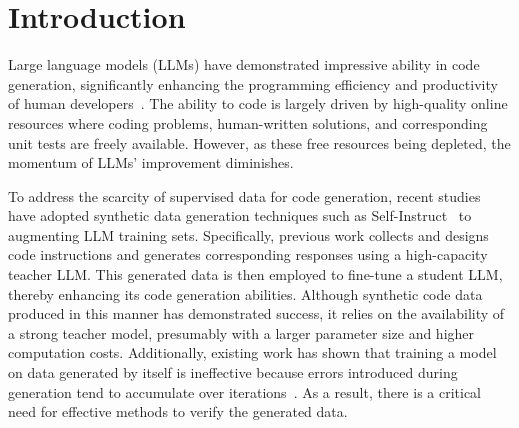 \section{Introduction}



Large language models (LLMs) have demonstrated impressive ability in code generation, significantly enhancing the programming efficiency and productivity of human developers~\cite{li2022competition,roziere2023code,codealpaca}.
The ability to code is largely driven by high-quality online resources where coding problems, human-written solutions, and corresponding unit tests are freely available. However, as these free resources being depleted, the momentum of LLMs' improvement diminishes.

To address the scarcity of supervised data for code generation, recent studies have adopted synthetic data generation techniques such as {\sc Self-Instruct}~\cite{wang2023self} to augmenting LLM training sets. 
Specifically, previous work collects and designs code instructions and generates corresponding responses using a high-capacity teacher LLM. This generated data is then employed to fine-tune a student LLM, thereby enhancing its code generation abilities. 
Although synthetic code data produced in this manner has demonstrated success, it relies on the availability of a strong teacher model, presumably with a larger parameter size and higher computation costs.
Additionally, existing work has shown that training a model on data generated by itself is ineffective because errors introduced during generation tend to accumulate over iterations~\cite{dubey2024llama}. As a result, there is a critical need for effective methods to verify the generated data.

